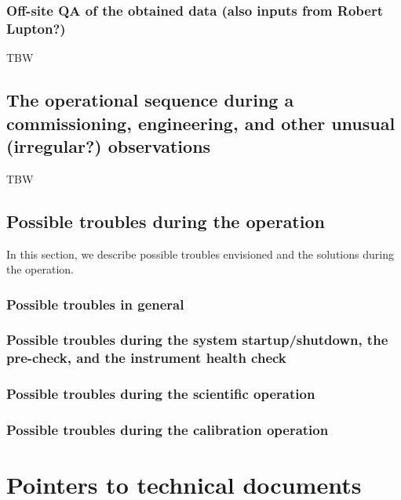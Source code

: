 \documentclass[a4paper]{article}
\begin{document}
\subsubsection{Off-site QA of the obtained data (also inputs from Robert Lupton?)}
TBW

\subsection{The operational sequence during a commissioning, engineering, and other unusual (irregular?) observations \label{sec:detail_ope_plan:engineering}}
TBW

\subsection{Possible troubles during the operation}
In this section, we describe possible troubles envisioned and the solutions during the operation.
\subsubsection{Possible troubles in general}
\subsubsection{Possible troubles during the system startup/shutdown, the pre-check, and the instrument health check}
\subsubsection{Possible troubles during the scientific operation}
\subsubsection{Possible troubles during the calibration operation}

\clearpage
\appendix
\section{Pointers to technical documents}
\end{document}

